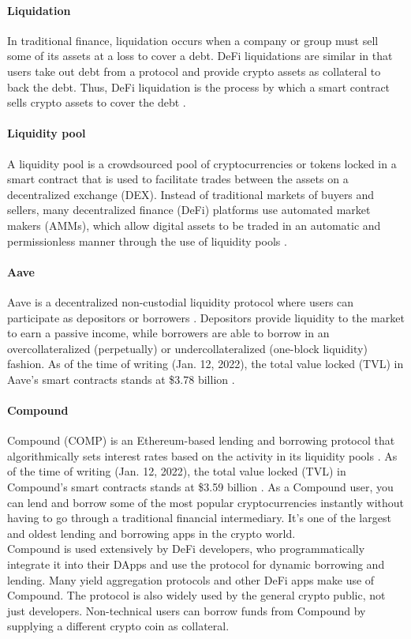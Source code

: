 \paragraph{Liquidation}
In traditional finance, liquidation occurs when a company or group must sell some of its assets at a loss to cover a debt. DeFi liquidations are similar in that users take out debt from a protocol and provide crypto assets as collateral to back the debt. Thus, DeFi liquidation is the process by which a smart contract sells crypto assets to cover the debt \cite{liquidation}.

\paragraph{Liquidity pool}
A liquidity pool is a crowdsourced pool of cryptocurrencies or tokens locked in a smart contract that is used to facilitate trades between the assets on a decentralized exchange (DEX). Instead of traditional markets of buyers and sellers, many decentralized finance (DeFi) platforms use automated market makers (AMMs), which allow digital assets to be traded in an automatic and permissionless manner through the use of liquidity pools \cite{liquiditypool}.

\paragraph{Aave}
Aave is a decentralized non-custodial liquidity protocol where users can participate as depositors or borrowers \cite{aave}. Depositors provide liquidity to the market to earn a passive income, while borrowers are able to borrow in an overcollateralized (perpetually) or undercollateralized (one-block liquidity) fashion. As of the time of writing (Jan. 12, 2022), the total value locked (TVL) in Aave’s smart contracts stands at \$3.78 billion \cite{lamaaave}.

\paragraph{Compound}
Compound (COMP) is an Ethereum-based lending and borrowing protocol that algorithmically sets interest rates based on the activity in its liquidity pools \cite{compound}. As of the time of writing (Jan. 12, 2022), the total value locked (TVL) in Compound’s smart contracts stands at \$3.59 billion \cite{lamacompound}. As a Compound user, you can lend and borrow some of the most popular cryptocurrencies instantly without having to go through a traditional financial intermediary. It’s one of the largest and oldest lending and borrowing apps in the crypto world.
\\
\indent Compound is used extensively by DeFi developers, who programmatically integrate it into their DApps and use the protocol for dynamic borrowing and lending. Many yield aggregation protocols and other DeFi apps make use of Compound. The protocol is also widely used by the general crypto public, not just developers. Non-technical users can borrow funds from Compound by supplying a different crypto coin as collateral.


